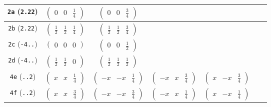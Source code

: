 \documentclass[fleqn,9pt,landscape]{jsarticle}
\begin{document}
\begin{center}
\begin{longtable}{ccccccc}
{\tt 2a} ({\tt 2.22}) & $ \begin{pmatrix} 0 & 0 & \frac{1}{4} \end{pmatrix} $ & $ \begin{pmatrix} 0 & 0 & \frac{3}{4} \end{pmatrix} $ & $  $ & $  $ & $  $ & $  $ \\ \hline
{\tt 2b} ({\tt 2.22}) & $ \begin{pmatrix} \frac{1}{2} & \frac{1}{2} & \frac{1}{4} \end{pmatrix} $ & $ \begin{pmatrix} \frac{1}{2} & \frac{1}{2} & \frac{3}{4} \end{pmatrix} $ & $  $ & $  $ & $  $ & $  $ \\ \hline
{\tt 2c} ({\tt -4..}) & $ \begin{pmatrix} 0 & 0 & 0 \end{pmatrix} $ & $ \begin{pmatrix} 0 & 0 & \frac{1}{2} \end{pmatrix} $ & $  $ & $  $ & $  $ & $  $ \\ \hline
{\tt 2d} ({\tt -4..}) & $ \begin{pmatrix} \frac{1}{2} & \frac{1}{2} & 0 \end{pmatrix} $ & $ \begin{pmatrix} \frac{1}{2} & \frac{1}{2} & \frac{1}{2} \end{pmatrix} $ & $  $ & $  $ & $  $ & $  $ \\ \hline
{\tt 4e} ({\tt ..2}) & $ \begin{pmatrix} x & x & \frac{1}{4} \end{pmatrix} $ & $ \begin{pmatrix} - x & - x & \frac{1}{4} \end{pmatrix} $ & $ \begin{pmatrix} - x & x & \frac{3}{4} \end{pmatrix} $ & $ \begin{pmatrix} x & - x & \frac{3}{4} \end{pmatrix} $ & $  $ & $  $ \\ \hline
{\tt 4f} ({\tt ..2}) & $ \begin{pmatrix} x & x & \frac{3}{4} \end{pmatrix} $ & $ \begin{pmatrix} - x & - x & \frac{3}{4} \end{pmatrix} $ & $ \begin{pmatrix} - x & x & \frac{1}{4} \end{pmatrix} $ & $ \begin{pmatrix} x & - x & \frac{1}{4} \end{pmatrix} $ & $  $ & $  $ \\ \hline

\end{longtable}
\end{center}
\end{document}
